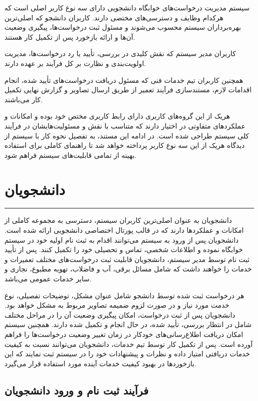 \documentclass[12pt,a4paper]{report}
\begin{document}
	\hspace{-0.1cm}
	سیستم مدیریت درخواست‌های خوابگاه دانشجویی دارای سه نوع کاربر اصلی است که هرکدام وظایف و دسترسی‌های مختصی دارند. کاربران دانشجو که اصلی‌ترین بهره‌برداران سیستم محسوب می‌شوند و مسئول ثبت درخواست‌ها، پیگیری وضعیت آن‌ها و ارائه بازخورد پس از تکمیل کار هستند.
	
	کاربران مدیر سیستم که نقش کلیدی در بررسی، تأیید یا رد درخواست‌ها، مدیریت اولویت‌بندی و نظارت بر کل فرآیند بر عهده دارند.
	
	همچنین کاربران تیم خدمات فنی که مسئول دریافت درخواست‌های تأیید شده، انجام اقدامات لازم، مستندسازی فرآیند تعمیر از طریق ارسال تصاویر و گزارش نهایی تکمیل کار می‌باشند.
	
	هریک از این گروه‌های کاربری دارای رابط کاربری مختص خود بوده و امکانات و عملکردهای متفاوتی در اختیار دارند که متناسب با نقش و مسئولیت‌هایشان در فرآیند کلی سیستم طراحی شده است. در ادامه این مستند، به تفصیل نحوه کار با سیستم از دیدگاه هریک از این سه نوع کاربر پرداخته خواهد شد تا راهنمای کاملی برای استفاده بهینه از تمامی قابلیت‌های سیستم فراهم شود.
	
	\section{دانشجویان}
	\noindent\rule{\textwidth}{0.4pt}
	
	دانشجویان به عنوان اصلی‌ترین کاربران سیستم، دسترسی به مجموعه کاملی از امکانات و عملکردها دارند که در قالب پورتال اختصاصی دانشجویی ارائه شده است. دانشجویان پس از ورود به سیستم می‌توانند اقدام به ثبت نام اولیه خود در سیستم خوابگاه نموده و اطلاعات شخصی، تماس و تحصیلی خود را تکمیل کنند. پس از تأیید ثبت نام توسط مدیر سیستم، دانشجویان قابلیت ثبت درخواست‌های مختلف تعمیرات و خدمات را خواهند داشت که شامل مسائل برقی، آب و فاضلاب، تهویه مطبوع، نجاری و سایر خدمات عمومی می‌باشد.
	
	هر درخواست ثبت شده توسط دانشجو شامل عنوان مشکل، توضیحات تفصیلی، نوع خدمت مورد نیاز و در صورت لزوم ضمیمه تصاویر مربوط به مشکل خواهد بود. دانشجویان پس از ثبت درخواست، امکان پیگیری وضعیت آن را در مراحل مختلف شامل در انتظار بررسی، تأیید شده، در حال انجام و تکمیل شده دارند. همچنین سیستم امکان دریافت اطلاع‌رسانی‌های خودکار در زمان تغییر وضعیت درخواست‌ها را فراهم آورده است. پس از تکمیل کار توسط تیم خدمات، دانشجویان می‌توانند نسبت به کیفیت خدمات دریافتی امتیاز داده و نظرات و پیشنهادات خود را در سیستم ثبت نمایند که این بازخوردها در بهبود کیفیت خدمات آینده مورد استفاده قرار می‌گیرد.
	
	\subsection{فرآیند ثبت نام و ورود دانشجویان}
	
\end{document}
